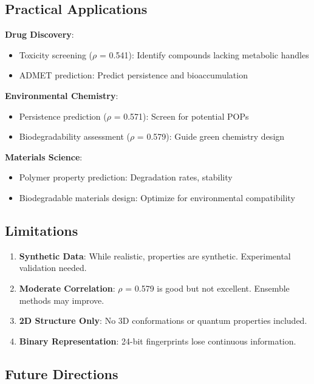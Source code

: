 \documentclass[11pt,letterpaper]{article}
\begin{document}
\subsection{Practical Applications}

\textbf{Drug Discovery}:
\begin{itemize}
    \item Toxicity screening ($\rho$ = 0.541): Identify compounds lacking metabolic handles
    \item ADMET prediction: Predict persistence and bioaccumulation
\end{itemize}

\textbf{Environmental Chemistry}:
\begin{itemize}
    \item Persistence prediction ($\rho$ = 0.571): Screen for potential POPs
    \item Biodegradability assessment ($\rho$ = 0.579): Guide green chemistry design
\end{itemize}

\textbf{Materials Science}:
\begin{itemize}
    \item Polymer property prediction: Degradation rates, stability
    \item Biodegradable materials design: Optimize for environmental compatibility
\end{itemize}

\subsection{Limitations}

\begin{enumerate}
    \item \textbf{Synthetic Data}: While realistic, properties are synthetic. Experimental validation needed.
    \item \textbf{Moderate Correlation}: $\rho$ = 0.579 is good but not excellent. Ensemble methods may improve.
    \item \textbf{2D Structure Only}: No 3D conformations or quantum properties included.
    \item \textbf{Binary Representation}: 24-bit fingerprints lose continuous information.
\end{enumerate}

\subsection{Future Directions}
\end{document}
